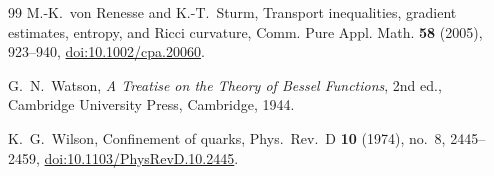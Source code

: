 \begin{thebibliography}{99}
M.-K.~von Renesse and K.-T.~Sturm, Transport inequalities, gradient estimates, entropy, and Ricci curvature, Comm. Pure Appl. Math. \textbf{58} (2005), 923--940, \href{https://doi.org/10.1002/cpa.20060}{doi:10.1002/cpa.20060}.

G.~N.~Watson, \emph{A Treatise on the Theory of Bessel Functions}, 2nd ed., Cambridge University Press, Cambridge, 1944.

K.~G.~Wilson, Confinement of quarks, Phys.\ Rev.\ D \textbf{10} (1974), no.~8, 2445--2459,
\href{https://doi.org/10.1103/PhysRevD.10.2445}{doi:10.1103/\allowbreak PhysRevD.10.2445}.

\end{thebibliography}
